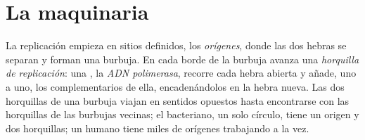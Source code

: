 \section{La maquinaria}

\begin{proposition}\label{prop:g11:dna-replication:forks}
La replicación empieza en sitios definidos, los \emph{orígenes}, donde
las dos hebras se separan y forman una burbuja. En cada borde de la
burbuja avanza una \emph{horquilla de replicación}:
una , la \emph{ADN polimerasa}, recorre
cada hebra abierta y añade, uno a uno, los  complementarios
de ella, encadenándolos en la hebra nueva. Las dos horquillas de una
burbuja viajan en sentidos opuestos hasta encontrarse con las
horquillas de las burbujas vecinas; el  bacteriano, un solo
círculo, tiene un origen y dos horquillas; un  humano tiene
miles de orígenes trabajando a la vez.
\end{proposition}
\admitted

